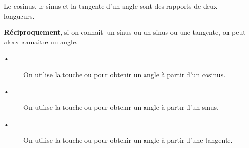 \begin{Def}
Le  cosinus, le  sinus et la tangente  d'un angle sont des rapports de deux longueurs. 

\textbf{Réciproquement}, si on connait, un sinus ou un sinus ou une tangente, on peut alors connaitre un angle.
\end{Def}

\begin{Mt}
\begin{description}
\item[•] On utilise la touche  ou  pour obtenir un angle à partir d'un cosinus.
\item[•] On utilise la touche  ou  pour obtenir un angle à partir d'un sinus.
\item[•] On utilise la touche  ou  pour obtenir un angle à partir d'une tangente.
\end{description}
\end{Mt}

